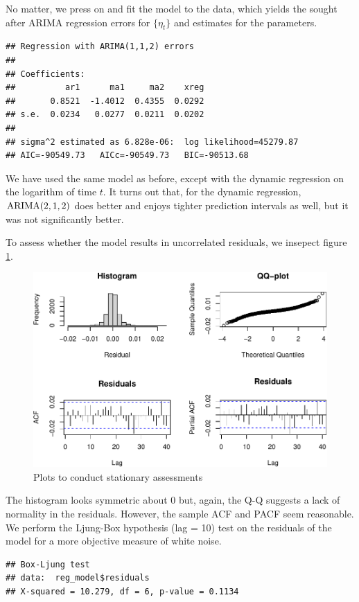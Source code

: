 \documentclass[final,
  11pt,
]{article}
\begin{document}
No matter, we press on and fit the model to the data, which yields the
sought after ARIMA regression errors for \(\{\eta_t\}\) and estimates
for the parameters.

\begin{verbatim}
## Regression with ARIMA(1,1,2) errors 
## 
## Coefficients:
##          ar1      ma1     ma2    xreg
##       0.8521  -1.4012  0.4355  0.0292
## s.e.  0.0234   0.0277  0.0211  0.0202
## 
## sigma^2 estimated as 6.828e-06:  log likelihood=45279.87
## AIC=-90549.73   AICc=-90549.73   BIC=-90513.68
\end{verbatim}

We have used the same model as before, except with the dynamic
regression on the logarithm of time \(t\). It turns out that, for the
dynamic regression, \(\operatorname{ARIMA}(2,1,2)\) does better and enjoys tighter
prediction intervals as well, but it was not significantly better.

To assess whether the model results in uncorrelated residuals, we
insepect figure \ref{fig:res}.

\begin{figure}
\includegraphics{paper_files/figure-latex/unnamed-chunk-18-1.pdf}
\caption{Plots to conduct stationary assessments}
\label{fig:res}
\end{figure}

The histogram looks symmetric about \(0\) but, again, the Q-Q suggests a
lack of normality in the residuals. However, the sample ACF and PACF
seem reasonable. We perform the Ljung-Box hypothesis (lag = 10) test on
the residuals of the model for a more objective measure of white noise.

\begin{verbatim}
## Box-Ljung test
## data:  reg_model$residuals
## X-squared = 10.279, df = 6, p-value = 0.1134
\end{verbatim}
\end{document}
